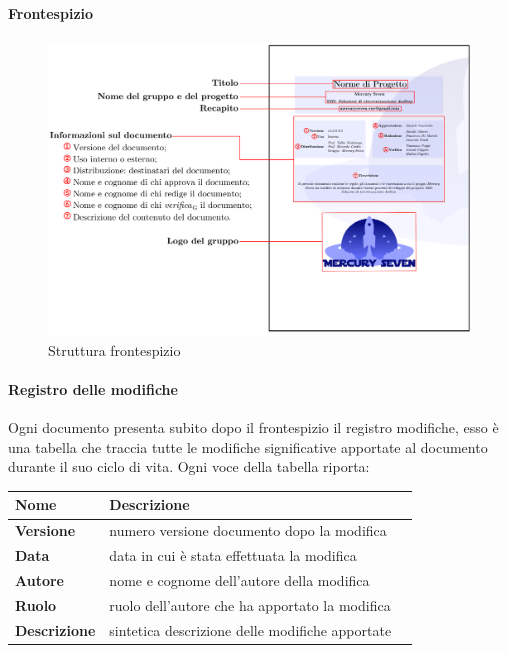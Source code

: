 {\paragraph*{Frontespizio}    

\begin{figure}[H]
    \centering
    \includegraphics[scale = 0.6]{components/immagini/frontespizio.png}
    \caption{Struttura frontespizio}
\end{figure}


\paragraph*{Registro delle modifiche}      
Ogni documento presenta subito dopo il frontespizio il registro modifiche, esso è una tabella che traccia tutte le modifiche significative apportate al documento durante il suo ciclo di vita. Ogni voce della tabella riporta:

	\setlength{\freewidth}{\dimexpr\textwidth-1\tabcolsep}
	\renewcommand{\arraystretch}{1.5}
	\setlength{\aboverulesep}{0pt}
	\setlength{\belowrulesep}{0pt}
	\begin{longtable}{L{.210\freewidth} L{.6\freewidth} L{.080\freewidth}}
		\textbf{Nome} & \textbf{Descrizione} \\
		\toprule
		\endhead		
		
	\textbf{Versione} & numero versione documento dopo la modifica \\
	\textbf{Data} & data in cui è stata effettuata la modifica \\
	\textbf{Autore} & nome e cognome dell'autore della modifica \\
	\textbf{Ruolo} & ruolo dell'autore che ha apportato la modifica \\
	\textbf{Descrizione} & sintetica descrizione delle modifiche apportate \\	
		

\end{longtable}}

